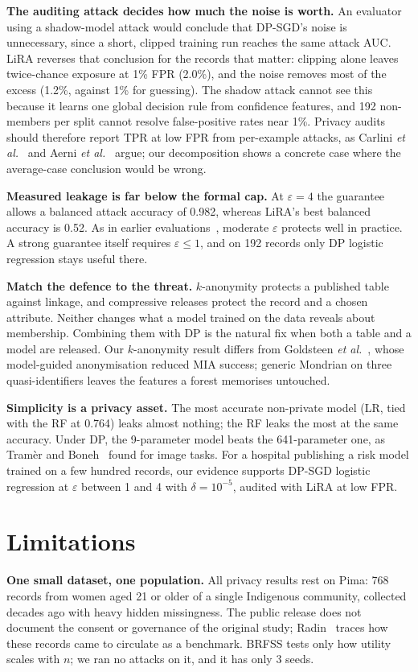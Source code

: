 \documentclass[conference]{IEEEtran}
\newcommand{\eps}{\varepsilon}
\begin{document}
\textbf{The auditing attack decides how much the noise is worth.} An evaluator using a shadow-model attack would conclude that DP-SGD's noise is unnecessary, since a short, clipped training run reaches the same attack AUC. LiRA reverses that conclusion for the records that matter: clipping alone leaves twice-chance exposure at 1\% FPR (2.0\%), and the noise removes most of the excess (1.2\%, against 1\% for guessing). The shadow attack cannot see this because it learns one global decision rule from confidence features, and 192 non-members per split cannot resolve false-positive rates near 1\%. Privacy audits should therefore report TPR at low FPR from per-example attacks, as Carlini \emph{et al.}~\cite{carlini2022} and Aerni \emph{et al.}~\cite{aerni2024} argue; our decomposition shows a concrete case where the average-case conclusion would be wrong.

\textbf{Measured leakage is far below the formal cap.} At $\eps{=}4$ the guarantee allows a balanced attack accuracy of 0.982, whereas LiRA's best balanced accuracy is 0.52. As in earlier evaluations~\cite{jayaraman2019}, moderate $\eps$ protects well in practice. A strong guarantee itself requires $\eps\leq1$, and on 192 records only DP logistic regression stays useful there.

\textbf{Match the defence to the threat.} $k$-anonymity protects a published table against linkage, and compressive releases protect the record and a chosen attribute. Neither changes what a model trained on the data reveals about membership. Combining them with DP is the natural fix when both a table and a model are released. Our $k$-anonymity result differs from Goldsteen \emph{et al.}~\cite{goldsteen2021}, whose model-guided anonymisation reduced MIA success; generic Mondrian on three quasi-identifiers leaves the features a forest memorises untouched.

\textbf{Simplicity is a privacy asset.} The most accurate non-private model (LR, tied with the RF at 0.764) leaks almost nothing; the RF leaks the most at the same accuracy. Under DP, the 9-parameter model beats the 641-parameter one, as Tram\`er and Boneh~\cite{tramer2021} found for image tasks. For a hospital publishing a risk model trained on a few hundred records, our evidence supports DP-SGD logistic regression at $\eps$ between 1 and 4 with $\delta{=}10^{-5}$, audited with LiRA at low FPR.

\section{Limitations}
\textbf{One small dataset, one population.} All privacy results rest on Pima: 768 records from women aged 21 or older of a single Indigenous community, collected decades ago with heavy hidden missingness. The public release does not document the consent or governance of the original study; Radin~\cite{radin2017} traces how these records came to circulate as a benchmark. BRFSS tests only how utility scales with $n$; we ran no attacks on it, and it has only 3 seeds.
\end{document}
